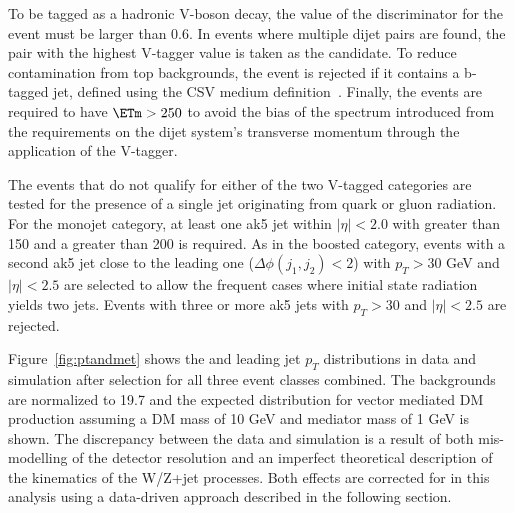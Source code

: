 
To be tagged as a hadronic V-boson decay, the value of the discriminator for the event must be larger than 0.6. In events 
where multiple dijet pairs are found, the pair with the highest V-tagger value is taken as the candidate. 
To reduce contamination from top backgrounds, the event is rejected if it contains a 
b-tagged jet, defined using the CSV medium definition~\cite{BTAG}. Finally, the events are required to 
have $\ETm>250$ \gev to avoid the bias of the \ETm spectrum introduced from the requirements 
on the dijet system's transverse momentum through the application of the V-tagger.

The events that do not qualify for either of the two V-tagged categories are tested for the presence of a single jet originating from quark or gluon radiation. 
For the monojet category, at least one ak5 jet within $|\eta|<2.0$ with \pt greater 
than 150 \gev and a \ETm greater than 200 \gev is required.  
As in the boosted category, events with a second ak5 jet close to the leading one ($\Delta\phi(j_1,j_2) < 2$) 
with $p_T>30$ GeV and $|\eta|<2.5$ are selected to allow the frequent cases where initial state radiation yields two jets.
Events with three or more ak5 jets with $p_T>30$ \gev and $|\eta|<2.5$ are rejected.

Figure~\ref{fig:ptandmet} shows the \ETm and leading jet $p_{T}$ distributions in data and 
simulation after selection for all three event classes combined. The backgrounds are normalized to 19.7\fbinv 
and the expected distribution for vector mediated DM production assuming a DM mass of 10 GeV and mediator mass of 1 GeV is shown. 
The discrepancy between the data and simulation is a result of both mis-modelling of the 
detector resolution and an imperfect theoretical description of the kinematics of the W/Z+jet processes. 
Both effects are corrected for in this analysis using a data-driven approach described in the following section. 

